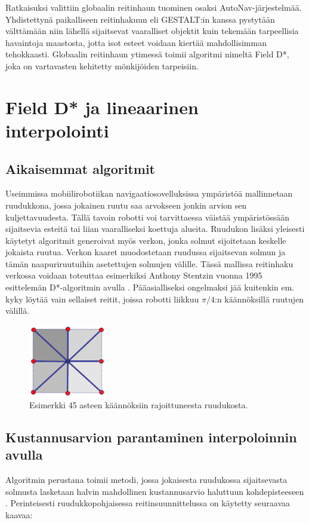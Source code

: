 \documentclass[finnish]{tktltiki2}
\theoremstyle{definition}
\theoremstyle{remark}
\begin{document}
Ratkaisuksi valittiin globaalin reitinhaun tuominen osaksi AutoNav-järjestelmää. Yhdistettynä paikalliseen reitinhakuun eli GESTALT:in kanssa pystytään välttämään niin lähellä sijaitsevat vaaralliset objektit kuin tekemään tarpeellisia havaintoja maastosta, jotta isot esteet voidaan kiertää mahdollisimman tehokkaasti. Globaalin reitinhaun ytimessä toimii algoritmi nimeltä Field D*, joka on vartavasten kehitetty mönkijöiden tarpeisiin.\cite{marsjuttuja}

\section{Field D* ja lineaarinen interpolointi}

\subsection{Aikaisemmat algoritmit}
Useimmissa mobiilirobotiikan navigaatiosovelluksissa ympäristöä mallinnetaan ruudukkona, jossa jokainen ruutu saa arvokseen jonkin arvion sen kuljettavuudesta. Tällä tavoin robotti voi tarvittaessa väistää ympäristössään sijaitsevia esteitä tai liian vaaralliseksi koettuja alueita. Ruudukon lisäksi yleisesti käytetyt algoritmit generoivat myös verkon, jonka solmut sijoitetaan keskelle jokaista ruutua. Verkon kaaret muodostetaan ruudussa sijaitsevan solmun ja tämän naapuriruutuihin asetettujen solmujen välille. Tässä mallissa reitinhaku verkossa voidaan toteuttaa esimerkiksi Anthony Stentzin vuonna 1995 esittelemän D*-algoritmin avulla \cite{stentz1995focussed}. Pääasialliseksi ongelmaksi jää kuitenkin em. kyky löytää vain sellaiset reitit, joissa robotti liikkuu $\pi/4$:n käännöksillä ruutujen välillä.

\begin{figure}[H]
	\caption{Esimerkki 45 asteen käännöksiin rajoittuneesta ruudukosta. \cite{marsjuttuja}}
	\centering
		\includegraphics[width=0.3\textwidth]{old_grid}
\end{figure}

\subsection{Kustannusarvion parantaminen interpoloinnin avulla}
Algoritmin perustana toimii metodi, jossa jokaisesta ruudukossa sijaitsevasta solmusta lasketaan halvin mahdollinen kustannusarvio haluttuun kohdepisteeseen \cite{ferguson2007field}. Perinteisesti ruudukkopohjaisessa reitinsuunnittelussa on käytetty seuraavaa kaavaa:
\end{document}
